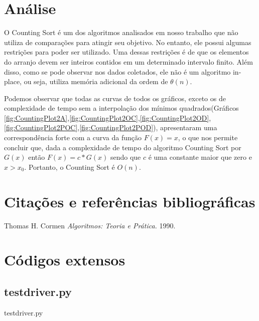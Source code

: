 \documentclass[12pt,a4paper,twoside]{report}
\begin{document}
\chapter{Análise}

O Counting Sort é um dos algoritmos analisados em nosso trabalho que não utiliza de comparações para atingir seu objetivo. No entanto, ele possui algumas restrições para poder ser utilizado. Uma dessas restrições é de que os elementos do arranjo devem ser inteiros contidos em um determinado intervalo finito. Além disso, como se pode observar nos dados coletados, ele não é um algoritmo in-place, ou seja, utiliza memória adicional da ordem de $\theta (n)$.

Podemos observar que todas as curvas de todos os gráficos, exceto os de complexidade de tempo sem a interpolação dos mínimos quadrados(Gráficos \ref{fig:CountingPlot2A},\ref{fig:CountingPlot2OC},\ref{fig:CountingPlot2OD},\ref{fig:CountingPlot2POC},\ref{fig:CountingPlot2POD}), apresentaram uma correspondência forte com a curva da função $F(x) = x$, o que nos permite concluir que, dada a complexidade de tempo do algoritmo Counting Sort por $G(x)$ então $F(x) = c * G(x)$ sendo que $c$ é uma constante maior que zero e $x > x_0$. Portanto, o Counting Sort é $O(n)$.

\chapter{Citações e referências bibliográficas}
	\begin{thebibliography}{1}
		
		 Thomas H. Cormen {\em 
			Algoritmos: Teoria e Prática.
		}  1990.
		
	\end{thebibliography}







\clearpage
{}
\appendix

\chapter{Códigos extensos \label{ap:testdriver}}
\section{testdriver.py}
 {testdriver.py}
\end{document}
